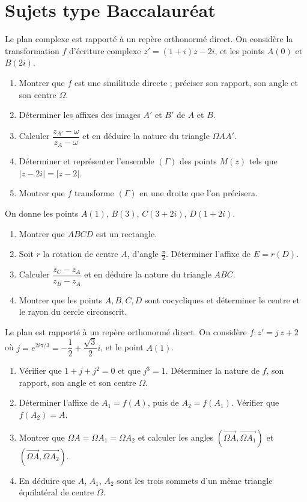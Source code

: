 \section{Sujets type Baccalauréat}

Le plan complexe est rapporté à un repère orthonormé direct. On considère la transformation $f$
d'écriture complexe $z'=(1+i)z-2i$, et les points $A(0)$ et $B(2i)$.
\begin{enumerate}[label=\arabic*)]
\item Montrer que $f$ est une similitude directe ; préciser son rapport, son angle et son centre $\Omega$.
\item Déterminer les affixes des images $A'$ et $B'$ de $A$ et $B$.
\item Calculer $\dfrac{z_{A'}-\omega}{z_A-\omega}$ et en déduire la nature du triangle $\Omega A A'$.
\item Déterminer et représenter l'ensemble $(\Gamma)$ des points $M(z)$ tels que $|z-2i|=|z-2|$.
\item Montrer que $f$ transforme $(\Gamma)$ en une droite que l'on précisera.
\end{enumerate}

On donne les points $A(1)$, $B(3)$, $C(3+2i)$, $D(1+2i)$.
\begin{enumerate}[label=\arabic*)]
\item Montrer que $ABCD$ est un rectangle.
\item Soit $r$ la rotation de centre $A$, d'angle $\frac\pi2$. Déterminer l'affixe de $E=r(D)$.
\item Calculer $\dfrac{z_C-z_A}{z_B-z_A}$ et en déduire la nature du triangle $ABC$.
\item Montrer que les points $A,B,C,D$ sont cocycliques et déterminer le centre et le rayon du
cercle circonscrit.
\end{enumerate}

Le plan est rapporté à un repère orthonormé direct. On considère $f:z'=j\,z+2$ où
$j=e^{2i\pi/3}=-\dfrac12+\dfrac{\sqrt3}2 i$, et le point $A(1)$.
\begin{enumerate}[label=\arabic*)]
\item Vérifier que $1+j+j^2=0$ et que $j^3=1$. Déterminer la nature de $f$, son rapport, son angle
et son centre $\Omega$.
\item Déterminer l'affixe de $A_1=f(A)$, puis de $A_2=f(A_1)$. Vérifier que $f(A_2)=A$.
\item Montrer que $\Omega A=\Omega A_1=\Omega A_2$ et calculer les angles
$(\overrightarrow{\Omega A},\overrightarrow{\Omega A_1})$ et $(\overrightarrow{\Omega A},\overrightarrow{\Omega A_2})$.
\item En déduire que $A$, $A_1$, $A_2$ sont les trois sommets d'un même triangle équilatéral de centre $\Omega$.
\end{enumerate}

